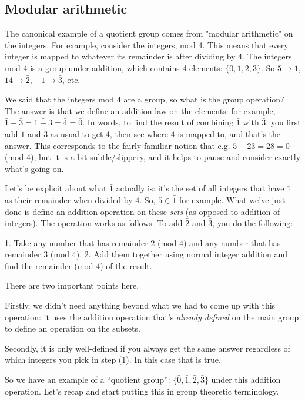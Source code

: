 \subsection{Modular arithmetic}

The canonical example of a quotient group comes from "modular arithmetic" on the integers. For
example, consider the integers, mod 4. This means that every integer is mapped to whatever its
remainder is after dividing by 4. The integers mod 4 is a group under addition, which contains 4
elements: $\{\bar 0, \bar 1, \bar 2, \bar 3\}$.
So $5 \rightarrow \bar 1$, $14 \rightarrow \bar 2$, $-1 \rightarrow \bar 3$, etc.

We said that the integers mod 4 are a group, so what is the group operation?
The answer is that we define an addition law on the elements: for example,
$\bar 1 + \bar 3 = \bar{1 + 3} = \bar 4 = \bar 0$. In words, to find the result
of combining $\bar 1$ with $\bar 3$, you first add $1$ and $3$ as usual to get
4, then see where $4$ is mapped to, and that's the answer. This corresponds to
the fairly familiar notion that e.g. $5 + 23 = 28 = 0$ (mod 4), but it is a bit
subtle/slippery, and it helps to pause and consider exactly what's going on.

Let's be explicit about what $\bar 1$ actually is: it's the set of all integers
that have $1$ as their remainder when divided by $4$. So, $5 \in \bar 1$ for
example. What we've just done is define an addition operation on these
\emph{sets} (as opposed to addition of integers). The operation works as
follows. To add $\bar 2$ and $\bar 3$, you do the following:

1. Take any number that has remainder $2$ (mod $4$) and any number that has
   remainder $3$ (mod $4$).
2. Add them together using normal integer addition and find the remainder (mod
   $4$) of the result.

There are two important points here.

Firstly, we didn't need anything beyond what we had to come up with this
operation: it uses the addition operation that's \emph{already defined} on the
main group to define an operation on the subsets.

Secondly, it is only well-defined if you always get the same answer regardless
of which integers you pick in step (1). In this case that is true.

So we have an example of a ``quotient group'': $\{\bar 0, \bar 1, \bar 2, \bar
3\}$ under this addition operation. Let's recap and start putting this in group
theoretic terminology.


